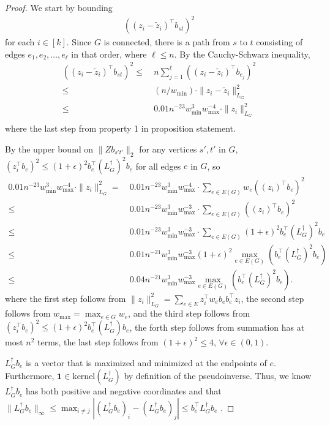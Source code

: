 \begin{proof}
We start by bounding
\begin{align*}
((z_i - \tilde{z}_i)^\top b_{st})^2
\end{align*}
for each $i\in [k]$. Since $G$ is connected, there is a path from $s$ to $t$ consisting of edges $e_1,e_2,\hdots,e_{\ell}$ in that order, where $\ell\le n$. By the Cauchy-Schwarz inequality,
\begin{align*}
((z_i - \tilde{z}_i)^\top b_{st})^2 
\le & ~ n \sum_{j=1}^{\ell} ((z_i - \tilde{z}_i)^\top b_{e_j})^2\\
\le & ~ (n/w_{\min}) \cdot \|z_i - \tilde{z}_i\|_{L_G}^2\\
\le & ~ 0.01 n^{-23} w_{\min}^3 w_{\max}^{-4} \cdot \|z_i\|_{L_G}^2\\
\end{align*}
where the last step from property 1 in proposition statement.


By the upper bound on $\|Zb_{s't'}\|_2$ for any vertices $s',t'$ in $G$, $(z_i^\top b_e)^2\le (1 + \epsilon)^2 b_e^\top (L_G^{\dagger})^2 b_e$ for all edges $e$ in $G$, so 
\begin{align*}
0.01 n^{-23} w_{\min}^3 w_{\max}^{-4} \cdot \|z_i\|_{L_G}^2 
= & ~ 0.01 n^{-23} w_{\min}^3 w_{\max}^{-4} \cdot \sum_{e\in E(G)} w_e((z_i)^\top b_e)^2\\
\le & ~ 0.01 n^{-23} w_{\min}^3 w_{\max}^{-3} \cdot \sum_{e\in E(G)} ((z_i)^\top b_e)^2\\
\le & ~ 0.01 n^{-23} w_{\min}^3 w_{\max}^{-3} \cdot \sum_{e\in E(G)} (1 + \epsilon)^2 b_e^\top (L_G^{\dagger})^2 b_e \\
\le & ~ 0.01 n^{-21} w_{\min}^3 w_{\max}^{-3} (1 + \epsilon)^2 \max_{e\in E(G)} (b_e^\top (L_G^{\dagger})^2 b_e)\\
\le & ~ 0.04 n^{-21} w_{\min}^3 w_{\max}^{-3} \max_{e\in E(G)} (b_e^\top (L_G^{\dagger})^2 b_e) .
\end{align*}
where the first step follows from $\| z_i \|_{L_G}^2 = \sum_{e \in E} z_i^\top w_e b_e b_e^\top z_i $, the second step follows from $w_{\max} = \max_{e\in G} w_e$, and the third step follows from $(z_i^\top b_e)^2 \leq (1+\epsilon)^2 b_e^\top (L_G^\dagger) b_e$, the forth step follows from summation has at most $n^2$ terms, the last step follows from $(1+\epsilon)^2 \leq 4$, $\forall \epsilon \in (0,1)$.

$L_G^{\dagger} b_e$ is a vector that is maximized and minimized at the endpoints of $e$. Furthermore, $\textbf{1}\in \text{kernel}(L_G^{\dagger})$ by definition of the pseudoinverse. Thus, we know $L_G^\dagger b_e $ has both positive and negative coordinates and that $\|L_G^{\dagger}b_e\|_{\infty} \leq \max_{i\neq j} | (L_G^\dagger b_e)_i - (L_G^\dagger b_e)_j | \le b_e^\top L_G^{\dagger} b_e$ .



\end{proof}
